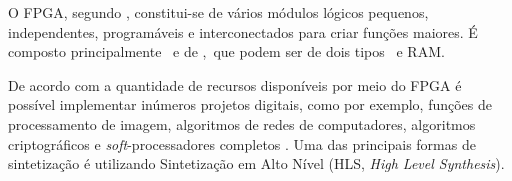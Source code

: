 



      O FPGA, segundo \cite{tocci2003sistemas}, constitui-se de vários módulos lógicos pequenos, independentes, programáveis e interconectados para criar funções maiores.
      É composto principalmente \ffs\ e de \luts,\ que podem ser de dois tipos \luts\ e \luts RAM.
      
      De acordo com a quantidade de recursos disponíveis por meio do FPGA é possível implementar inúmeros projetos digitais, como por exemplo, funções de processamento de imagem, algoritmos de redes de computadores, algoritmos criptográficos e \textit{soft}-processadores completos \cite{Plessl2003, Choi2016}.
      Uma das principais formas de sintetização é utilizando Sintetização em Alto Nível (HLS, \textit{High Level Synthesis}).
      

